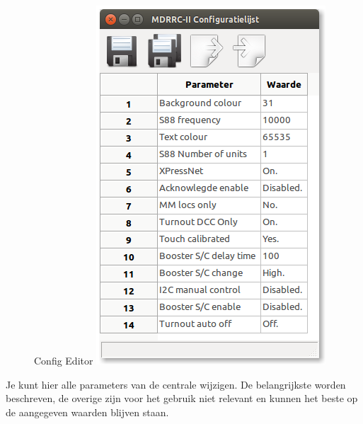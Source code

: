 \documentclass[12pt,a4paper]{report}
\begin{document}
\begin{figure}[!ht]
  \captionbox
  {Config Editor\label{scs:configeditor}}
  {\includegraphics[scale=0.5]{images/rcu_screenshot3}}\\
\end{figure}

Je kunt hier alle parameters van de centrale wijzigen. De belangrijkste worden beschreven, de overige zijn voor het gebruik niet relevant en kunnen het beste op de aangegeven waarden blijven staan.
\end{document}
